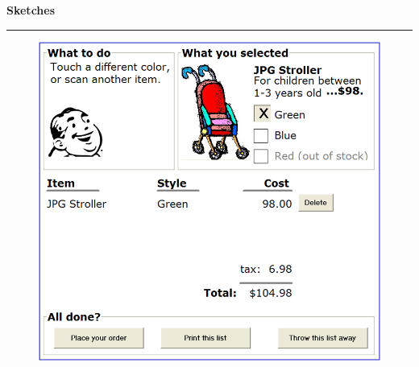 \documentclass[pdf]{beamer}
\begin{document}
\begin{frame}
\vspace{8mm}
\textcolor{myBlue}{\textbf{\Large{Sketches}}}

\textcolor{red}{\rule{10cm}{1mm}}

    \begin{figure}[b]
    	\includegraphics[scale = 0.4]{slide17pic.png}
    \end{figure}
\end{frame}
\end{document}
